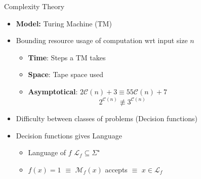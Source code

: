 \documentclass[usenames,dvipsnames]{beamer}
\newcommand{\cC}{\mathcal{C}}
\newcommand{\cL}{\mathcal{L}}
\newcommand{\cM}{\mathcal{M}}
\begin{document}
\begin{frame}{Complexity Theory}
    \begin{itemize}
        \item<1-> \textbf{Model:} Turing Machine (TM)
        \item<2-> Bounding resource usage of computation wrt input size $n$
            \begin{itemize}
                \item<3-> \textbf{Time}: Steps a TM takes
                \item<4-> \textbf{Space}: Tape space used
                \item<5-> \textbf{Asymptotical}: $2\cC(n) + 3\equiv 55\cC(n) + 7$\\
                ~~~~~~~~~~~~~~~~~~~~$2^{\cC(n)}\not\equiv 3^{\cC(n)}$
            \end{itemize}
        \item<6-> Difficulty between classes of problems (Decision functions)
        \item<7-> Decision functions gives Language
        \begin{itemize}
            \item<8-> Language of $f$ $\cL_f\subseteq\Sigma^\star$
            \item<9-> $f(x) = 1$ $\equiv$ $\cM_f(x)$ accepts $\equiv$ $x\in \cL_f$
        \end{itemize}
    \end{itemize}
\end{frame}
\end{document}
